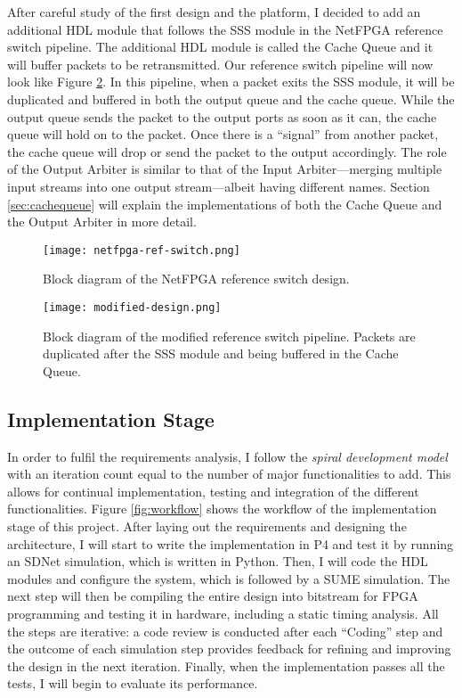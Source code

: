 	After careful study of the first design and the platform, I decided to add an additional HDL module that follows the SSS module in the NetFPGA reference switch pipeline. The additional HDL module is called the Cache Queue and it will buffer packets to be retransmitted. Our reference switch pipeline will now look like Figure \ref{fig:modified-design}. In this pipeline, when a packet exits the SSS module, it will be duplicated and buffered in both the output queue and the cache queue. While the output queue sends the packet to the output ports as soon as it can, the cache queue will hold on to the packet. Once there is a ``signal'' from another packet, the cache queue will drop or send the packet to the output accordingly. The role of the Output Arbiter is similar to that of the Input Arbiter---merging multiple input streams into one output stream---albeit having different names. Section \ref{sec:cachequeue} will explain the implementations of both the Cache Queue and the Output Arbiter in more detail.
	
	\begin{figure}[!ht]
		\centering
		\texttt{[image: netfpga-ref-switch.png]}
		\caption{Block diagram of the NetFPGA reference switch design.}
		\label{fig:netfpga-ref-switch}
	\end{figure}
	
	\begin{figure}[!ht]
		\centering
		\texttt{[image: modified-design.png]}
		\caption{Block diagram of the modified reference switch pipeline. Packets are duplicated after the SSS module and being buffered in the Cache Queue.}
		\label{fig:modified-design}
	\end{figure}
		
	\subsection{Implementation Stage}
	
	In order to fulfil the requirements analysis, I follow the \textit{spiral development model} \cite{spiral} with an iteration count equal to the number of major functionalities to add. This allows for continual implementation, testing and integration of the different functionalities. Figure \ref{fig:workflow} shows the workflow of the implementation stage of this project. After laying out the requirements and designing the architecture, I will start to write the implementation in P4 and test it by running an SDNet simulation, which is written in Python. Then, I will code the HDL modules and configure the system, which is followed by a SUME simulation. The next step will then be compiling the entire design into bitstream for FPGA programming and testing it in hardware, including a static timing analysis. All the steps are iterative: a code review is conducted after each ``Coding'' step and the outcome of each simulation step provides feedback for refining and improving the design in the next iteration. Finally, when the implementation passes all the tests, I will begin to evaluate its performance.
			
